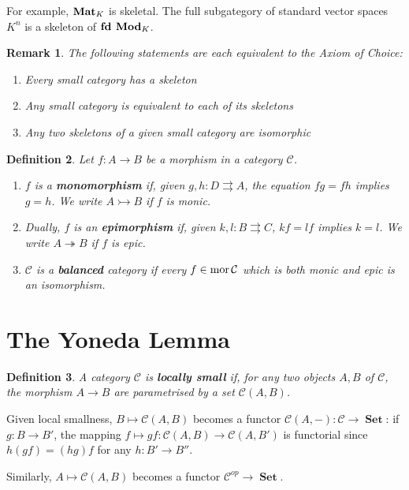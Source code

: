 \documentclass[a4paper]{article}
\newtheorem{definition}{Definition}
\newtheorem{remark}[definition]{Remark}
\numberwithin{definition}{section}
\newcommand*\mor[1]{\textnormal{mor}\,#1}
\DeclareMathOperator{\Set}{\textbf{Set}}
\begin{document}
For example, $\text{\textbf{Mat}}_K$ is skeletal. The full subgategory of standard vector spaces $K^n$ is a skeleton of $\text{\textbf{fd Mod}}_K$.

\begin{remark}
	The following statements are each equivalent to the Axiom of Choice:
	\begin{enumerate}
		\item Every small category has a skeleton
		\item Any small category is equivalent to each of its skeletons
		\item Any two skeletons of a given small category are isomorphic
	\end{enumerate}
\end{remark}

\begin{definition}
	Let $f: A \to B$ be a morphism in a category $\mathcal{C}$.
	\begin{enumerate}[label=\alph*.]
		\item $f$ is a \textbf{monomorphism} if, given $g,h:D \rightrightarrows A$, the equation $fg = fh$ implies $g=h$. We write $A \rightarrowtail B$ if $f$ is monic.
		\item Dually, $f$ is an \textbf{epimorphism} if, given $k,l: B \rightrightarrows C$, $kf = lf$ implies $k=l$. We write $A \twoheadrightarrow B$ if $f$ is epic.
		\item $\mathcal{C}$ is a \textbf{balanced} category if every $f \in \mor \mathcal{C}$ which is both monic and epic is an isomorphism.
	\end{enumerate}
\end{definition}

\section{The Yoneda Lemma}
\begin{definition}
	A category $\mathcal{C}$ is \textbf{locally small} if, for any two objects $A, B$ of $\mathcal{C}$, the morphism $A \to B$ are parametrised by a set $\mathcal{C}(A, B)$.
\end{definition}

Given local smallness, $B \mapsto \mathcal{C}(A,B)$ becomes a functor $\mathcal{C}(A, -): \mathcal{C} \to \Set$: if $g: B \to B'$,
the mapping $f \mapsto gf : \mathcal{C}(A, B) \to \mathcal{C}(A, B')$ is functorial since $h(gf) = (hg)f$ for any $h: B' \to B''$.

Similarly, $A \mapsto \mathcal{C}(A, B)$ becomes a functor $\mathcal{C}^{op} \to \Set$.
\end{document}
